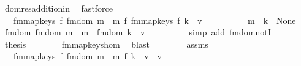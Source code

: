 \begin{isabellebody}
\ dom{\isacharunderscore}{\kern0pt}res{\isacharunderscore}{\kern0pt}addition{\isacharunderscore}{\kern0pt}in\ \isamarkupfalse%
\ fastforce\isanewline
\ \ \isamarkupfalse%
\ \isamarkupfalse%
\ {\isachardoublequoteopen}{\isasymdots}\ {\isacharequal}{\kern0pt}\ fmmap{\isacharunderscore}{\kern0pt}keys\ {\isacharquery}{\kern0pt}f\ {\isacharparenleft}{\kern0pt}fmdom{\isacharprime}{\kern0pt}\ m\ {\isasymlhd}\ m\ {\isacharplus}{\kern0pt}{\isacharplus}{\kern0pt}\isactrlsub f\ fmmap{\isacharunderscore}{\kern0pt}keys\ {\isacharquery}{\kern0pt}f\ {\isacharbraceleft}{\kern0pt}k\ {\isachardollar}{\kern0pt}{\isachardollar}{\kern0pt}{\isacharcolon}{\kern0pt}{\isacharequal}{\kern0pt}\ v{\isacharprime}{\kern0pt}{\isacharbraceright}{\kern0pt}{\isachardoublequoteclose}\isanewline
\ \ \isamarkupfalse%
\ {\isacharminus}{\kern0pt}\isanewline
\ \ \ \ \isamarkupfalse%
\ {\isacartoucheopen}m\ {\isachardollar}{\kern0pt}{\isachardollar}{\kern0pt}\ k\ {\isacharequal}{\kern0pt}\ None{\isacartoucheclose}\ \isamarkupfalse%
\ {\isachardoublequoteopen}fmdom{\isacharprime}{\kern0pt}\ {\isacharparenleft}{\kern0pt}fmdom{\isacharprime}{\kern0pt}\ m\ {\isasymlhd}\ m\ {\isasyminter}\ fmdom{\isacharprime}{\kern0pt}\ {\isacharbraceleft}{\kern0pt}k\ {\isachardollar}{\kern0pt}{\isachardollar}{\kern0pt}{\isacharcolon}{\kern0pt}{\isacharequal}{\kern0pt}\ v{\isacharprime}{\kern0pt}{\isacharbraceright}{\kern0pt}\ {\isacharequal}{\kern0pt}\ {\isacharbraceleft}{\kern0pt}{\isacharbraceright}{\kern0pt}{\isachardoublequoteclose}\isanewline
\ \ \ \ \ \ \isamarkupfalse%
\ {\isacharparenleft}{\kern0pt}simp\ add{\isacharcolon}{\kern0pt}\ fmdom{\isacharprime}{\kern0pt}{\isacharunderscore}{\kern0pt}notI{\isacharparenright}{\kern0pt}\isanewline
\ \ \ \ \isamarkupfalse%
\ \isamarkupfalse%
\ {\isacharquery}{\kern0pt}thesis\isanewline
\ \ \ \ \ \ \isamarkupfalse%
\ fmmap{\isacharunderscore}{\kern0pt}keys{\isacharunderscore}{\kern0pt}hom\ \isamarkupfalse%
\ blast\isanewline
\ \ \isamarkupfalse%
\isanewline
\ \ \isamarkupfalse%
\ \isamarkupfalse%
\ assms\isanewline
\ \ \isamarkupfalse%
\ {\isachardoublequoteopen}{\isasymdots}\ {\isacharequal}{\kern0pt}\ fmmap{\isacharunderscore}{\kern0pt}keys\ {\isacharquery}{\kern0pt}f\ {\isacharparenleft}{\kern0pt}fmdom{\isacharprime}{\kern0pt}\ m\ {\isasymlhd}\ m\ {\isacharplus}{\kern0pt}{\isacharplus}{\kern0pt}\isactrlsub f\ {\isacharbraceleft}{\kern0pt}k\ {\isachardollar}{\kern0pt}{\isachardollar}{\kern0pt}{\isacharcolon}{\kern0pt}{\isacharequal}{\kern0pt}\ v{\isacharprime}{\kern0pt}\ {\isacharplus}{\kern0pt}\ v{\isacharbraceright}{\kern0pt}{\isachardoublequoteclose}\isanewline

\end{isabellebody}

